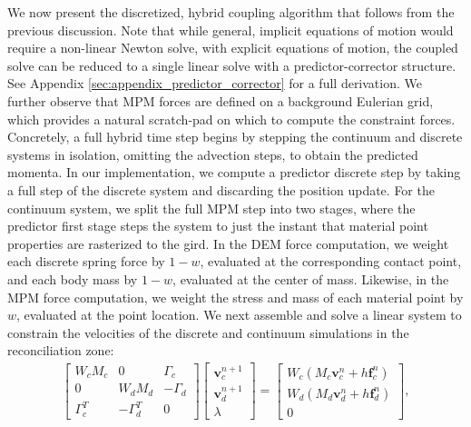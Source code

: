 We now present the discretized, hybrid coupling algorithm that follows from the previous discussion. 
Note that while
general, implicit equations of motion would require a non-linear Newton solve, with explicit equations of motion, the
coupled solve can be reduced to a single linear solve with a predictor-corrector structure. See Appendix
\ref{sec:appendix_predictor_corrector} for a full derivation. We further observe that MPM forces are defined on a
background Eulerian grid, which provides a natural scratch-pad on which to compute the constraint forces. 
Concretely, a full hybrid time step begins by stepping the continuum and discrete systems in isolation, omitting the advection steps, to obtain the predicted momenta.
In our implementation, we compute a predictor discrete step by taking a full step of the discrete system and discarding the position update. For the continuum system, we split the full MPM step into two stages, 
where the predictor first stage steps the system to just the instant that material point properties are rasterized to the gird.
In the DEM force computation, we weight each discrete spring force by $1-w$, evaluated at the corresponding contact point, and each body mass by $1-w$, evaluated at the center of mass. Likewise, in the MPM force computation, we weight the stress and mass of each material point by $w$, evaluated at the point location. We next assemble and solve a linear system to
constrain the velocities of the discrete and continuum simulations in the reconciliation zone:
\begin{align}
\begin{bmatrix}
    W_c M_c & 0 & \Gamma_c \\
    0 & W_d M_d & -\Gamma_d \\
    \Gamma_c^T & -\Gamma_d^T & 0
\end{bmatrix}
\begin{bmatrix}
    \bm{v}_c^{n+1} \\
    \bm{v}_d^{n+1} \\
    \lambda
\end{bmatrix}
=
\begin{bmatrix}
    W_c \left( M_c \bm{v}^n_c + h \bm{f}^n_c \right) \\
    W_d \left( M_d \bm{v}^n_d + h \bm{f}^n_d \right) \\
    0
\end{bmatrix} , \label{eq:coupled_system}
\end{align}
